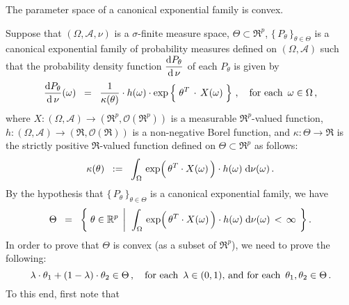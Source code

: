 \begin{theorem}\quad
The parameter space of a {\color{red}canonical} exponential family is convex.
\end{theorem}
\proof
Suppose that $(\Omega,\mathcal{A},\nu)$ is a $\sigma$-finite measure space,
$\Theta \subset \Re^{p}$, $\{\,P_{\theta}\,\}_{\theta\in\Theta}$ is a canonical exponential family 
of probability measures defined on $(\Omega,\mathcal{A})$ such that the probability
density function $\dfrac{\textnormal{d} P_{\theta}}{\textnormal{d}\,\nu}$ of each $P_{\theta}$ is given by
\begin{equation*}
	\dfrac{\d P_{\theta}}{\d\,\nu}(\omega)
	\;\; = \;\;
		\dfrac{1}{\kappa(\theta)}
		\cdot
		h(\omega)
		\cdot
		\exp\left\{\; \theta^{T} \overset{{\color{white}-}}{\cdot} X(\omega) \;\right\}
		\,,
		\quad
		\textnormal{for each \,$\omega\in\Omega$}\,,
\end{equation*}
where
$X : (\Omega,\mathcal{A}) \longrightarrow (\Re^{p},\mathcal{O}(\Re^{p}))$
is a measurable $\Re^{p}$-valued function,
$h : (\Omega,\mathcal{A}) \longrightarrow (\Re,\mathcal{O}(\Re))$
is a non-negative Borel function, and
$\kappa : \Theta \longrightarrow \Re$ is the strictly positive
$\Re$-valued function defined on $\Theta \subset \Re^{p}$ as follows:
\begin{equation*}
\kappa(\theta)
\;\; := \;\;
	\int_{\Omega}\,
		\exp\!\left(\,\theta^{T} \!\overset{{\color{white}-}}{\cdot}\! X(\omega)\,\right) \cdot h(\omega)
	\;\d\nu(\omega)\,.
\end{equation*}
By the hypothesis that $\{\,P_{\theta}\,\}_{\theta\in\Theta}$ is a canonical exponential family, we have
\begin{equation*}
\Theta
\;\; = \;\;
	\left\{\;
		\theta \in \Re^{p}
		\;\left\vert\;\;
		\int_{\Omega}\,
			\exp\!\left(\,\theta^{T} \!\overset{{\color{white}-}}{\cdot}\! X(\omega)\,\right) \cdot h(\omega)
		\;\d\nu(\omega)
		\, < \, \infty
		\right.
	\;\right\}.
\end{equation*}
In order to prove that $\Theta$ is convex (as a subset of $\Re^{p}$),
we need to prove the following:
\begin{equation*}
\lambda \cdot \theta_{1} + (1 - \lambda) \cdot \theta_{2} \in \Theta\,,
\quad
\textnormal{for each \,$\lambda \in (0,1)$, and for each \,$\theta_{1}, \theta_{2} \in \Theta$}\,.
\end{equation*}
To this end, first note that
